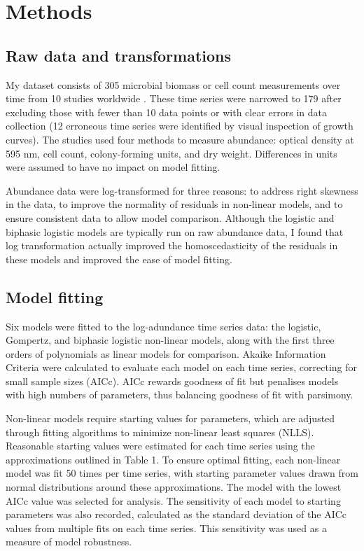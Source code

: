 \documentclass{article}
\begin{document}
\section{Methods}
\subsection{Raw data and transformations}

My dataset consists of 305 microbial biomass or cell count measurements over time from 10 studies worldwide \cite{bae2014, bernhardt2018, galarz2016, gill1991, phillips1987, roth1962, silva2018, sivonen1990, stannard1985, zwietering1994}. These time series were narrowed to 179 after excluding those with fewer than 10 data points or with clear errors in data collection (12 erroneous time series were identified by visual inspection of growth curves). The studies used four methods to measure abundance: optical density at 595 nm, cell count, colony-forming units, and dry weight. Differences in units were assumed to have no impact on model fitting. 

Abundance data were log-transformed for three reasons: to address right skewness in the data, to improve the normality of residuals in non-linear models, and to ensure consistent data to allow model comparison. Although the logistic and biphasic logistic models are typically run on raw abundance data, I found that log transformation actually improved the homoscedasticity of the residuals in these models and improved the ease of model fitting.

\subsection{Model fitting}

Six models were fitted to the log-adundance time series data: the logistic, Gompertz, and biphasic logistic non-linear models, along with the first three orders of polynomials as linear models for comparison. Akaike Information Criteria were calculated to evaluate each model on each time series, correcting for small sample sizes (AICc). AICc rewards goodness of fit but penalises models with high numbers of parameters, thus balancing goodness of fit with parsimony. 

Non-linear models require starting values for parameters, which are adjusted through fitting algorithms to minimize non-linear least squares (NLLS). Reasonable starting values were estimated for each time series using the approximations outlined in Table 1. To ensure optimal fitting, each non-linear model was fit 50 times per time series, with starting parameter values drawn from normal distributions around these approximations. The model with the lowest AICc value was selected for analysis. The sensitivity of each model to starting parameters was also recorded, calculated as the standard deviation of the AICc values from multiple fits on each time series. This sensitivity was used as a measure of model robustness.
\end{document}
